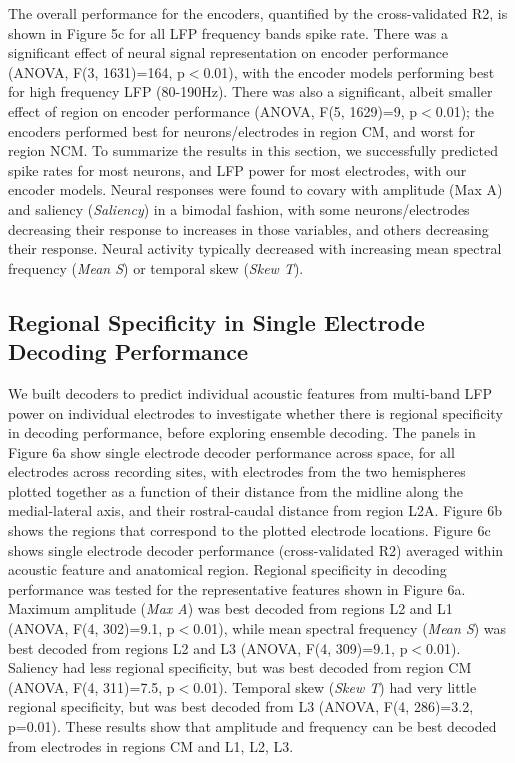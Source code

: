     The overall performance for the encoders, quantified by the cross-validated R2, is shown in Figure 5c for all LFP frequency bands spike rate. There was a significant effect of neural signal representation on encoder performance (ANOVA, F(3, 1631)=164, p$<$0.01), with the encoder models performing best for high frequency LFP (80-190Hz). There was also a significant, albeit smaller effect of region on encoder performance (ANOVA, F(5, 1629)=9, p$<$0.01); the encoders performed best for neurons/electrodes in region CM, and worst for region NCM. To summarize the results in this section, we successfully predicted spike rates for most neurons, and LFP power for most electrodes, with our encoder models. Neural responses were found to covary with amplitude (Max A) and saliency ({\em Saliency}) in a bimodal fashion, with some neurons/electrodes decreasing their response to increases in those variables, and others decreasing their response. Neural activity typically decreased with increasing mean spectral frequency ({\em Mean S}) or temporal skew ({\em Skew T}).

\subsection{Regional Specificity in Single Electrode Decoding Performance}

We built decoders to predict individual acoustic features from multi-band LFP power on individual electrodes to investigate whether there is regional specificity in decoding performance, before exploring ensemble decoding. The panels in Figure 6a show single electrode decoder performance across space, for all electrodes across recording sites, with electrodes from the two hemispheres plotted together as a function of their distance from the midline along the medial-lateral axis, and their rostral-caudal distance from region L2A. Figure 6b shows the regions that correspond to the plotted electrode locations. Figure 6c shows single electrode decoder performance (cross-validated R2) averaged within acoustic feature and anatomical region. Regional specificity in decoding performance was tested for the representative features shown in Figure 6a. Maximum amplitude ({\em Max A}) was best decoded from regions L2 and L1 (ANOVA, F(4, 302)=9.1, p$<$0.01), while mean spectral frequency ({\em Mean S}) was best decoded from regions L2 and L3 (ANOVA, F(4, 309)=9.1, p$<$0.01). Saliency had less regional specificity, but was best decoded from region CM (ANOVA, F(4, 311)=7.5, p$<$0.01). Temporal skew ({\em Skew T}) had very little regional specificity, but was best decoded from L3 (ANOVA, F(4, 286)=3.2, p=0.01). These results show that amplitude and frequency can be best decoded from electrodes in regions CM and L1, L2, L3. 

